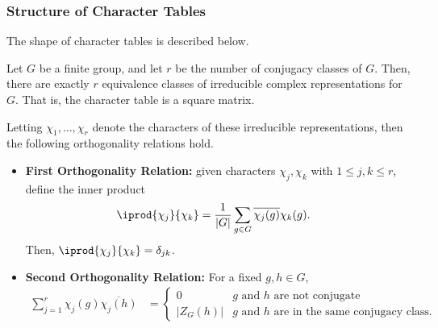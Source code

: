 \documentclass[10pt]{mypackage}
\begin{document}
\subsubsection{Structure of Character Tables}%
The shape of character tables is described below.
\begin{theorem}
  Let $G$ be a finite group, and let $r$ be the number of conjugacy classes of $G$. Then, there are exactly $r$ equivalence classes of irreducible complex representations for $G$. That is, the character table is a square matrix.
\end{theorem}
Letting $\chi_1,\dots,\chi_r$ denote the characters of these irreducible representations, then the following orthogonality relations hold.
\begin{theorem}\hfill
  \begin{itemize}
    \item \textbf{First Orthogonality Relation:} given characters $\chi_j,\chi_k$ with $1\leq j,k\leq r$, define the inner product
      \begin{align*}
        \iprod{\chi_j}{\chi_k} &= \frac{1}{\left\vert G \right\vert}\sum_{g\in G} \overline{\chi_j(g)} \chi_k(g).
      \end{align*}
      Then, $ \iprod{\chi_j}{\chi_k} = \delta_{jk} $.
    \item \textbf{Second Orthogonality Relation:} For a fixed $g,h\in G$,
      \begin{align*}
        \sum_{j=1}^{r} \chi_j\left( g \right) \overline{\chi_j\left( h \right)} &= \begin{cases}
          0 & \text{$g$ and $h$ are not conjugate}\\
          \left\vert Z_G(h) \right\vert & \text{$g$ and $h$ are in the same conjugacy class}.
        \end{cases}
      \end{align*}
  \end{itemize}
\end{theorem}
\end{document}
